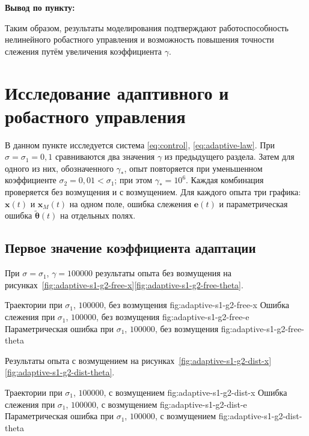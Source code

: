 \noindent\textbf{Вывод по пункту:}

Таким образом, результаты моделирования подтверждают работоспособность нелинейного робастного управления и возможность повышения точности слежения путём увеличения коэффициента \(\gamma\).


\section{Исследование адаптивного и робастного управления}

В данном пункте исследуется система
\eqref{eq:control}, \eqref{eq:adaptive-law}. При $\sigma=\sigma_1=0{,}1$
сравниваются два значения $\gamma$ из предыдущего раздела.
Затем для одного из них, обозначенного $\gamma_*$, опыт повторяется
при уменьшенном коэффициенте $\sigma_2=0{,}01<\sigma_1$;
при этом $\gamma_*=10^6$.
Каждая комбинация проверяется без возмущения и с возмущением.
Для каждого опыта  три графика: $\bm x(t)$ и $\bm x_M(t)$
на одном поле, ошибка слежения $\bm e(t)$ и параметрическая ошибка
$\tilde{\bm\theta}(t)$ на отдельных полях.

\subsection{Первое значение коэффициента адаптации}

При $\sigma=\sigma_1$, $\gamma=100000$ результаты опыта без возмущения
 на рисунках~\mbox{\ref{fig:adaptive-s1-g2-free-x}\textendash\ref{fig:adaptive-s1-g2-free-theta}}.

  {Траектории при $\sigma_1$, $100000$, без возмущения}
  {fig:adaptive-s1-g2-free-x}
  {Ошибка слежения при $\sigma_1$, $100000$, без возмущения}
  {fig:adaptive-s1-g2-free-e}
  {Параметрическая ошибка при $\sigma_1$, $100000$, без возмущения}
  {fig:adaptive-s1-g2-free-theta}

Результаты опыта с возмущением
на рисунках~\mbox{\ref{fig:adaptive-s1-g2-dist-x}\textendash\ref{fig:adaptive-s1-g2-dist-theta}}.

  {Траектории при $\sigma_1$, $100000$, с возмущением}
  {fig:adaptive-s1-g2-dist-x}
  {Ошибка слежения при $\sigma_1$, $100000$, с возмущением}
  {fig:adaptive-s1-g2-dist-e}
  {Параметрическая ошибка при $\sigma_1$, $100000$, с возмущением}
  {fig:adaptive-s1-g2-dist-theta}

